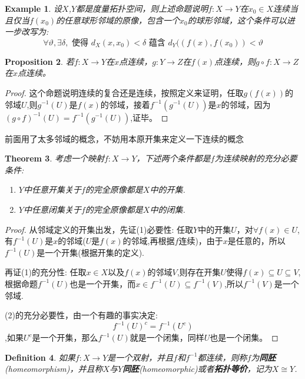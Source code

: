 \documentclass{article}
\newtheorem{theorem}{Theorem}[section]
\newtheorem{proposition}[theorem]{Proposition}
\newtheorem{example}[theorem]{Example}
\newtheorem{definition}[theorem]{Definition}
\newcommand*{\xfunc}[4]{{#2}\colon{#3}{#1}{#4}}
\newcommand*{\func}[3]{\xfunc{\to}{#1}{#2}{#3}}
\begin{document}
\begin{example}
设$X$,$Y$都是度量拓扑空间，则上述命题说明$\func{f}{X}{Y}$在$x_0 \in X$连续当且仅当$f(x_0)$的任意球形邻域的原像，包含一个$x_0$的球形邻域，这个条件可以进一步改写为:\[\forall \vartheta ,\exists \delta,\text{ 使得 } d_X(x,x_0) < \delta \text{ 蕴含 }d_Y((f(x),f(x_0)) < \vartheta\]
\end{example}

\begin{proposition}
若$\func{f}{X}{Y}$在$x$点连续，$\func{g}{Y}{Z}$在$f(x)$点连续，则$\func{g \circ f}{X}{Z}$在$x$点连续。
\end{proposition}

\begin{proof}
这个命题说明连续的复合还是连续，按照定义来证明，任取$g(f(x))$的邻域$U$,则$g^{-1}(U)$是$f(x)$的邻域，接着$f^{-1}(g^{-1}(U))$是$x$的邻域，因为$(g \circ f)^{-1}(U)=f^{-1}(g^{-1}(U))$,证毕。
\end{proof}

前面用了太多邻域的概念，不妨用本原开集来定义一下连续的概念

\begin{theorem}
考虑一个映射$\func{f}{X}{Y}$，下述两个条件都是$f$为连续映射的充分必要条件:
\begin{enumerate}
	\item $Y$中任意开集关于$f$的完全原像都是$X$中的开集.
	\item $Y$中任意闭集关于$f$的完全原像都是$X$中的闭集.
\end{enumerate}
\end{theorem}

\begin{proof}
从邻域定义的开集出发，先证(1)必要性: 任取$Y$中的开集$U$，对$\forall f(x) \in U$,有$f^{-1}(U)$是$x$的邻域($U$是$f(x)$的邻域,再根据$f$连续)，由于$x$是任意的，所以$f^{-1}(U)$是一个开集(根据开集的定义).

再证(1)的充分性: 任取$x \in X$以及$f(x)$的邻域$V$,则存在开集$U$使得$f(x) \subseteq U \subseteq V$,根据命题$f^{-1}(U)$也是一个开集，而$x \in f^{-1}(U) \subseteq f^{-1}(V)$,所以$f^{-1}(V)$是一个邻域.	

(2)的充分必要性，由一个有趣的事实决定: \[f^{-1}(U)^c  = f^{-1}(U^c)\],如果$U^c$是一个开集，那么$f^{-1}(U)$就是一个闭集，同样$U$也是一个闭集。
\end{proof}

\begin{definition}
如果$\func{f}{X}{Y}$是一个双射，并且$f$和$f^{-1}$都连续，则称$f$为\textbf{同胚}(homeomorphism)，并且称$X$与$Y$\textbf{同胚}(homeomorphic)或者\textbf{拓扑等价}，记为$X \cong Y$.
\end{definition}
\end{document}

